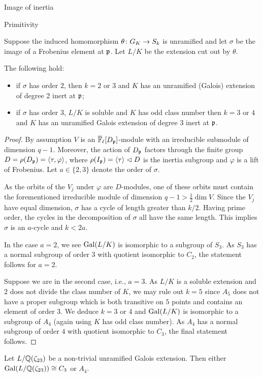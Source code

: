 \documentclass[11pt,a4paper]{article}
\begin{document}
\begin{section}{Image of inertia}
\begin{subsection}{Primitivity}
\begin{lemma}
Suppose the induced homomorphism $\theta\colon G_{K} \rightarrow S_k$ is unramified and let $\sigma$ be the image of a Frobenius element at $\mathfrak{p}$. Let $L/K$ be the extension cut out by $\theta$.

The following hold:
\begin{itemize}
    \item if $\sigma$ has order $2$, then $k=2$ or $3$ and $K$ has an unramified (Galois) extension of degree 2 inert at $\mathfrak{p}$;
    \item if $\sigma$ has order $3$, $L/K$ is soluble and $K$ has odd class number then $k=3$ or $4$ and $K$ has an unramified Galois extension of degree $3$ inert at $\mathfrak{p}$.
\end{itemize}
\end{lemma}

\begin{proof}
By assumption $V$ is an ${\overline{\mathbb{F}}_\ell}[D_{\mathfrak{p}}]$-module with an irreducible submodule of dimension $q-1$.
Moreover, the action of $D_{\mathfrak{p}}$ factors through the finite group $D = \rho(D_{\mathfrak{p}}) = \langle \tau , \varphi \rangle$, where $\rho(I_{\mathfrak{p}}) = \langle \tau \rangle \vartriangleleft D$ is the inertia subgroup and $\varphi$ is a lift of Frobenius.
Let $a \in \{2,3\}$ denote the order of $\sigma$.

As the orbits of the $V_j$ under $\varphi$ are $D$-modules, one of these orbits must contain the forementioned irreducible module of dimension $q-1>\frac{1}{2}\dim V$.
Since the $V_j$ have equal dimension, $\sigma$ has a cycle of length greater than $k/2$.
Having prime order, the cycles in the decomposition of $\sigma$ all have the same length. 
This implies $\sigma$ is an $a$-cycle and $k<2a$.

In the case $a=2$, we see $\Gal(L/K)$ is isomorphic to a subgroup of $S_3$. As $S_3$ has a normal subgroup of order $3$ with quotient isomorphic to $C_2$, the statement follows for $a=2$.

Suppose we are in the second case, i.e., $a=3$.
As $L/K$ is a soluble extension and $2$ does not divide the class number of $K$, we may rule out $k=5$ since $A_5$ does not have a proper subgroup which is both transitive on $5$ points and contains an element of order $3$.
We deduce $k=3$ or $4$ and $\Gal(L/K)$ is isomorphic to a subgroup of $A_4$ (again using $K$ has odd class number).
As $A_4$ has a normal subgroup of order $4$ with quotient isomorphic to $C_3$, the final statement follows.
\end{proof}

\begin{lemma}
\label{lemma_primitivity_unramified_extns_of_23}
Let $L/\mathbb{Q}(\zeta_{23})$ be a non-trivial unramified Galois extension. Then either $\Gal(L/\QQ(\zeta_{23})) \cong C_3$ or $ A_4$.
\end{lemma}


\end{subsection}
\end{section}
\end{document}
